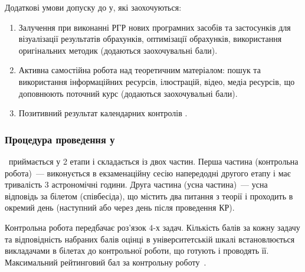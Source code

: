 \documentclass{Syllabus}
\begin{document}
Додаткові умови допуску до \control у, які заохочуються:
\begin{enumerate}[label=$\bullet$]
	\item Залучення при виконанні РГР нових програмних засобів та застосунків для візуалізації результатів обрахунків, оптимізації обрахунків, використання оригінальних методик (додаються заохочувальні бали).
	\item Активна самостійна робота над теоретичним матеріалом: пошук та використання інформаційних ресурсів, ілюстрацій, відео, медіа ресурсів, що доповнюють поточний курс (додаються заохочувальні бали).
	\item Позитивний результат календарних контролів
.
\end{enumerate}


\subsubsection*{Процедура проведення \control у}

\Control\ приймається у 2 етапи і складається із двох частин. Перша частина (контрольна робота)~--- виконується в екзаменаційну сесію напередодні другого етапу і має тривалість $3$ астрономічні години. Друга частина (усна частина)~--- усна відповідь за білетом (співбесіда), що містить два питання з теорії і проходить в окремий день (наступний або через день після проведення КР).

Контрольна робота передбачає роз'язок $4$-х задач. Кількість балів за кожну задачу та відповідність набраних балів оцінці в університетській шкалі встановлюється викладачами в білетах до контрольної роботи, що готують і проводять її. Максимальний рейтинговий бал за контрольну роботу~\kontrolBalp.
\end{document}
